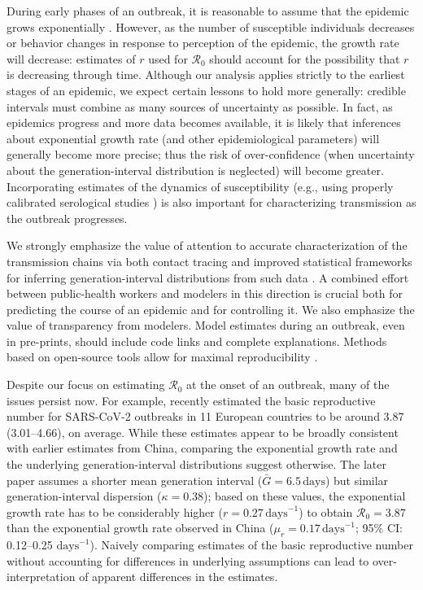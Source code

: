 \documentclass[12pt]{article}
\newcommand{\Ro}{\ensuremath{{\mathcal R}_{0}}\xspace}
\providecommand{\DIFaddtex}[1]{{\protect\color{blue}\uwave{#1}}} %
\providecommand{\DIFaddbegin}{} %
\providecommand{\DIFaddend}{} %
\providecommand{\DIFadd}[1]{\texorpdfstring{\DIFaddtex{#1}}{#1}} %
\newcommand{\DIFaddincludegraphics}[2][]{{\color{blue}\fbox{\DIFOincludegraphics[#1]{#2}}}} %
\DeclareRobustCommand{\DIFaddbegin}{\DIFOaddbegin \let\includegraphics\DIFaddincludegraphics} %
\DeclareRobustCommand{\DIFaddend}{\DIFOaddend \let\includegraphics\DIFOincludegraphics} %
\begin{document}
During early phases of an outbreak, it is reasonable to assume that the epidemic grows exponentially \citep{anderson1991infectious}.
However, as the number of susceptible individuals decreases or behavior changes in response to perception of the epidemic, the growth rate will decrease: estimates of $r$ used for \Ro should account for the possibility that $r$ is decreasing through time.
Although our analysis applies strictly to the earliest stages of an epidemic, we expect certain lessons to hold more generally: \DIFaddbegin \DIFadd{confidence/}\DIFaddend credible intervals must combine as many sources of uncertainty as possible. 
In fact, as epidemics progress and more data becomes available, it is likely that inferences about exponential growth rate (and other epidemiological parameters) will generally become more precise; thus the risk of over-confidence (when uncertainty about the generation-interval distribution is neglected) will become greater.
Incorporating estimates of the dynamics of susceptibility (e.g., using properly calibrated serological studies \citep{metcalf2016use}) is also important for characterizing transmission as the outbreak progresses.

We strongly emphasize the value of attention to accurate characterization of the transmission chains via both contact tracing and improved statistical frameworks for inferring generation-interval distributions from such data \citep{britton2019estimation}.
A combined effort between public-health workers and modelers in this direction is crucial both for predicting the course of an epidemic and for controlling it.
We also emphasize the value of transparency from modelers.
Model estimates during an outbreak, even in pre-prints, should include code links and complete explanations.
Methods based on open-source tools allow for maximal reproducibility \citep{barton2020call}.

Despite our focus on estimating \Ro at the onset of an outbreak, many of the issues persist now. 
For example, \cite{flaxman2020estimating} recently estimated the basic reproductive number for SARS-CoV-2 outbreaks in 11 European countries to be around 3.87 (3.01--4.66), on average.
While these estimates appear to be broadly consistent with earlier estimates from China, comparing the exponential growth rate and the underlying generation-interval distributions suggest otherwise.
The later paper assumes a shorter mean generation interval ($\bar G = 6.5\,\textrm{days}$) but similar generation-interval dispersion ($\kappa = 0.38$);
based on these values, the exponential growth rate has to be considerably higher ($r = 0.27\,\textrm{days}^{-1}$) to obtain $\Ro = 3.87$ than the exponential growth rate observed in China ($\mu_r = 0.17\,\textrm{days}^{-1}$; 95\% CI: 0.12--0.25 $\textrm{days}^{-1}$).
Naively comparing estimates of the basic reproductive number without accounting for differences in underlying assumptions can lead to over-interpretation of apparent differences in the estimates.
\end{document}
